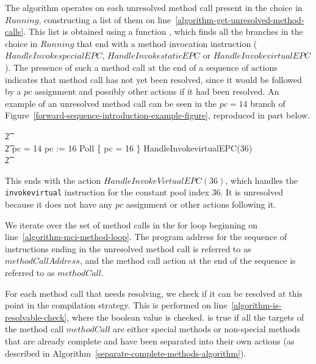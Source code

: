 The algorithm operates on each unresolved method call present in the
choice in $Running$, constructing a list of them on
line~\ref{algorithm-get-unresolved-method-calls}.
This list is obtained using a function ,
which finds all the branches in the choice in $Running$ that end with
a method invocation instruction ($HandleInvokespecialEPC$,
$HandleInvokestaticEPC$ or $HandleInvokevirtualEPC$).
The presence of such a method call at the end of a sequence of actions
indicates that method call has not yet been resolved, since it would
be followed by a $pc$ assignment and possibly other actions if it had
been resolved.
An example of an unresolved method call can be seen in the $pc = 14$
branch of Figure~\ref{forward-sequence-introduction-example-figure},
reproduced in part below.
\begin{circusaction}
  \t2 {} \cdots {} \\
  \t2 {} \circelse pc = 14 \circthen \cdots \circseq pc := 16 \circseq Poll \circseq \{ pc = 16 \} \circseq HandleInvokevirtualEPC(36) \\
  \t2 {} \cdots {}
\end{circusaction}
This ends with the action $HandleInvokeVirtualEPC(36)$, which handles
the \texttt{invokevirtual} instruction for the constant pool index
$36$.
It is unresolved because it does not have any $pc$ assignment or other
actions following it.

We iterate over the set of method calls in the for loop beginning on
line~\ref{algorithm-mci-method-loop}.
The program address for the sequence of instructions ending in the
unresolved method call is referred to as $methodCallAddress$, and the
method call action at the end of the sequence is referred to as
$methodCall$.

For each method call that needs resolving, we check if it can be
resolved at this point in the compilation strategy.
This is performed on line~\ref{algorithm-is-resolvable-check}, where
the boolean value  is checked.
 is true if all the targets of the method
call $methodCall$ are either special methods or non-special methods that are
already complete and have been separated into their own actions (as
described in Algorithm~\ref{separate-complete-methods-algorithm}).


